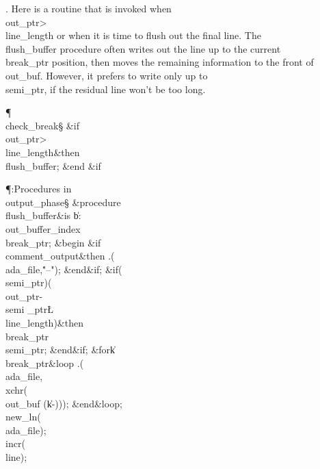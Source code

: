 . Here is a routine that is invoked when \\{out\_ptr}\?>\?\\{line\_length}
or when it is time to flush out the final line. The \\{flush\_buffer} procedure
often writes out the line up to the current \\{break\_ptr} position, then moves
the
remaining information to the front of \\{out\_buf}. However, it prefers to
write only up to \\{semi\_ptr}, if the residual line won't be too long.

\Y\P\4\D\\{check\_break}\?\S\?\6
\&{if}\1\1\8\\{out\_ptr}\?>\?\\{line\_length}\2\8\&{then}\6
\\{flush\_buffer}; \&{end} \&{if}\1\par
\Y\P\?\4:Procedures in \\{output\_phase}\X\mathrel{+}\S\?\6
\&{procedure}\8\1\\{flush\_buffer}\2\8\&{is}\8\1\6
\|b\?:\?\\{out\_buffer\_index}\?\K\?\\{break\_ptr};\6
\4\&{begin}\6
\&{if}\1\1\8\\{comment\_output}\2\8\&{then}\6
\?.\?\?\1(\?\\{ada\_file}\?,\?\.{"--"}\?\2)\?;\2\6
\&{end}\8\2\&{if}\1;\6
\&{if}\1\1\?\8\1(\?\\{semi\_ptr}\?\I{}\?\2)\W\1(\?\\{out\_ptr}\?-\?\\{semi%
\_ptr}\?\L\?\\{line\_length}\?\2)\?\2\8\&{then}\6
\\{break\_ptr}\?\K\?\\{semi\_ptr};\2\6
\&{end}\8\2\&{if}\1;\6
\1\&{for}\8\|k\?\in{}\?\to\?\\{break\_ptr}\8\&{loop}\6
\?.\?\?\1(\?\\{ada\_file}\?,\?\\{xchr}\?\1(\?\\{out\_buf}%
\?\1(\?\|k\?-\?\2)\2)\2)\?;\2\6
\&{end}\8\&{loop};\6
\\{new\_ln}\?\1(\?\\{ada\_file}\?\2)\?;\5
\\{incr}\?\1(\?\\{line}\?\2)\?;\5
